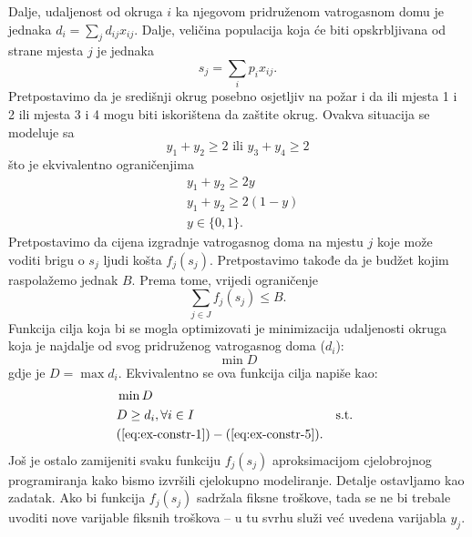 \documentclass[a4paper, utf8, 11pt, colorlinks]{article}
\begin{document}
Dalje, udaljenost od okruga $i$ ka njegovom pridruženom vatrogasnom domu je jednaka $d_i = \sum_{j} d_{ij}x_{ij} $. Dalje, veličina populacija koja će biti opskrbljivana od strane mjesta $j$ je jednaka 
\begin{equation}\label{eq:ex-constr-3}
    s_j = \sum_{i} p_i x_{ij}. 
\end{equation}
Pretpostavimo da je središnji okrug posebno osjetljiv na požar i da ili mjesta 1 i 2 ili mjesta 3 i 4 mogu biti iskorištena da zaštite okrug. Ovakva situacija se modeluje sa
\begin{equation*} 
    y_1 + y_2 \geq 2 \mbox{ ili } y_3 + y_4 \geq 2
\end{equation*}
što je ekvivalentno ograničenjima 
\begin{align}
    &y_1 + y_2 \geq 2 y \nonumber \\
    &y_1 + y_2 \geq 2 (1-y) \nonumber \\
    & y \in \{0, 1 \}.\label{eq:ex-constr-4}
\end{align}
Pretpostavimo da cijena izgradnje vatrogasnog doma na mjestu $j$ koje može voditi brigu o $s_j$ ljudi košta $f_j(s_j)$. Pretpostavimo takođe da je budžet kojim raspolažemo jednak $B$. Prema tome, vrijedi ograničenje
\begin{equation}\label{eq:ex-constr-5}
     \sum_{j \in J} f_j(s_j) \leq B.
\end{equation}
 Funkcija cilja koja bi se mogla optimizovati je minimizacija udaljenosti 
 okruga koja je najdalje od svog pridruženog vatrogasnog doma ($d_i$):
      $$\min D $$
 gdje je $D= \max d_i$. Ekvivalentno se ova funkcija cilja napiše kao:
 \begin{align*}
      &\min D \\
      & D \geq d_i,  \forall i \in I
      & \mbox{s.t. } \\ &(\ref{eq:ex-constr-1})-(\ref{eq:ex-constr-5}).
 \end{align*}
 Još je ostalo zamijeniti svaku funkciju $f_j (s_j)$ aproksimacijom cjelobrojnog programiranja kako bismo izvršili cjelokupno modeliranje. Detalje ostavljamo kao zadatak. Ako bi funkcija $f_j (s_j)$ sadržala fiksne troškove, tada se ne bi trebale uvoditi nove varijable fiksnih troškova -- u tu svrhu služi već uvedena varijabla $y_j$. 
 
\end{document}
